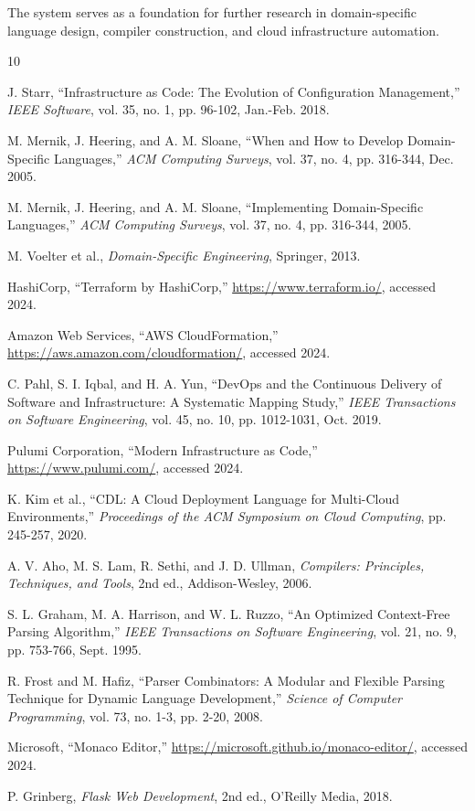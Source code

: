 \documentclass[journal,twocolumn,10pt]{IEEEtran}
\begin{document}
The system serves as a foundation for further research in domain-specific language design, compiler construction, and cloud infrastructure automation.

\begin{thebibliography}{10}

J. Starr, ``Infrastructure as Code: The Evolution of Configuration Management,'' \emph{IEEE Software}, vol. 35, no. 1, pp. 96-102, Jan.-Feb. 2018.

M. Mernik, J. Heering, and A. M. Sloane, ``When and How to Develop Domain-Specific Languages,'' \emph{ACM Computing Surveys}, vol. 37, no. 4, pp. 316-344, Dec. 2005.

M. Mernik, J. Heering, and A. M. Sloane, ``Implementing Domain-Specific Languages,'' \emph{ACM Computing Surveys}, vol. 37, no. 4, pp. 316-344, 2005.

M. Voelter et al., \emph{Domain-Specific Engineering}, Springer, 2013.

HashiCorp, ``Terraform by HashiCorp,'' \url{https://www.terraform.io/}, accessed 2024.

Amazon Web Services, ``AWS CloudFormation,'' \url{https://aws.amazon.com/cloudformation/}, accessed 2024.

C. Pahl, S. I. Iqbal, and H. A. Yun, ``DevOps and the Continuous Delivery of Software and Infrastructure: A Systematic Mapping Study,'' \emph{IEEE Transactions on Software Engineering}, vol. 45, no. 10, pp. 1012-1031, Oct. 2019.

Pulumi Corporation, ``Modern Infrastructure as Code,'' \url{https://www.pulumi.com/}, accessed 2024.

K. Kim et al., ``CDL: A Cloud Deployment Language for Multi-Cloud Environments,'' \emph{Proceedings of the ACM Symposium on Cloud Computing}, pp. 245-257, 2020.

A. V. Aho, M. S. Lam, R. Sethi, and J. D. Ullman, \emph{Compilers: Principles, Techniques, and Tools}, 2nd ed., Addison-Wesley, 2006.

S. L. Graham, M. A. Harrison, and W. L. Ruzzo, ``An Optimized Context-Free Parsing Algorithm,'' \emph{IEEE Transactions on Software Engineering}, vol. 21, no. 9, pp. 753-766, Sept. 1995.

R. Frost and M. Hafiz, ``Parser Combinators: A Modular and Flexible Parsing Technique for Dynamic Language Development,'' \emph{Science of Computer Programming}, vol. 73, no. 1-3, pp. 2-20, 2008.

Microsoft, ``Monaco Editor,'' \url{https://microsoft.github.io/monaco-editor/}, accessed 2024.

P. Grinberg, \emph{Flask Web Development}, 2nd ed., O'Reilly Media, 2018.

\end{thebibliography}
\end{document}
